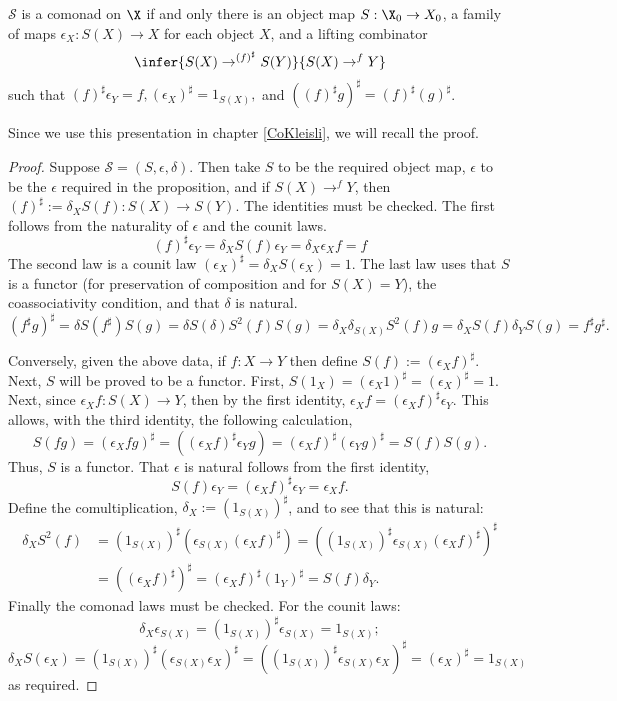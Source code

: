\begin{prop}\label{CoKliesliComonad}
 $\mathcal{S}$ is a comonad on $\X$ if and only there is an object map $S : \X_0 \to X_0$, a family of maps $\epsilon_X : S(X) \to X$ for each object $X$, and  a lifting combinator
$$\infer{S(X) \to^{(f)^{\sharp}} S(Y)}{S(X) \to^{f} Y}$$
such that
$(f)^\sharp \epsilon_Y = f, (\epsilon_X)^\sharp = 1_{S(X)},$ and $((f)^\sharp g)^\sharp = (f)^\sharp (g)^\sharp$.
\end{prop}
Since we use this presentation in chapter \ref{CoKleisli}, we will recall the proof.
\begin{proof}
 Suppose $\mathcal{S} = (S,\epsilon,\delta)$.  Then take $S$ to be the required object map, $\epsilon$ to be the $\epsilon$ required in the proposition, and if $S(X) \to^{f} Y$, then $(f)^\sharp := \delta_X S(f) : S(X) \to S(Y)$.  The identities must be checked.  The first follows from the naturality of $\epsilon$ and the counit laws.
$$(f)^\sharp \epsilon_Y = \delta_X S(f) \epsilon_Y = \delta_X \epsilon_X f = f$$
The second law is a counit law $(\epsilon_X)^\sharp = \delta_X S(\epsilon_X) = 1$.  The last law uses that $S$ is a functor (for preservation of composition and for $S(X)=Y$), the coassociativity condition, and that $\delta$ is natural.
$$(f^\sharp g)^\sharp = \delta S(f^\sharp)S(g) = \delta S(\delta) S^2(f) S(g) = \delta_X \delta_{S(X)} S^2(f)g = \delta_X S(f) \delta_Y S(g) = f^\sharp g^\sharp.$$



Conversely, given the above data, if $f : X \to Y$ then define $S(f) := (\epsilon_X f)^\sharp$.   Next, $S$ will be proved to be a functor.  First,
$S(1_X) = (\epsilon_X 1)^\sharp = (\epsilon_X)^\sharp = 1.$  Next, since $\epsilon_X f : S(X) \to Y$, then by the first identity, $\epsilon_X f = (\epsilon_X f)^\sharp \epsilon_Y$.  This allows, with the third identity, the following calculation,
$$S(fg) = (\epsilon_X f g)^\sharp = ((\epsilon_X f)^\sharp \epsilon_Y g) = (\epsilon_X f)^\sharp (\epsilon_Y g)^\sharp = S(f)S(g).$$
Thus, $S$ is a functor.  That $\epsilon$ is natural follows from the first identity,
$$S(f)\epsilon_Y = (\epsilon_X f)^\sharp \epsilon_Y = \epsilon_X f.$$
Define the comultiplication, $\delta_X := (1_{S(X)})^\sharp$, and to see that this is natural:
\begin{align*}
 \delta_X S^2(f) &= (1_{S(X)})^\sharp (\epsilon_{S(X)} (\epsilon_X f)^\sharp) = ((1_{S(X)})^\sharp \epsilon_{S(X)} (\epsilon_X f)^\sharp)^\sharp\\
                 &= ((\epsilon_X f)^\sharp)^\sharp = (\epsilon_X f)^\sharp (1_Y)^\sharp = S(f) \delta_Y.
\end{align*}
Finally the comonad laws must be checked.
For the counit laws:
$$\delta_X \epsilon_{S(X)} = (1_{S(X)})^\sharp \epsilon_{S(X)} = 1_{S(X)};$$
$$\delta_X S(\epsilon_X) = (1_{S(X)})^\sharp(\epsilon_{S(X)}\epsilon_X)^\sharp = ((1_{S(X)})^\sharp \epsilon_{S(X)} \epsilon_X)^\sharp = (\epsilon_X)^\sharp = 1_{S(X)}$$
as required.  



\end{proof}

